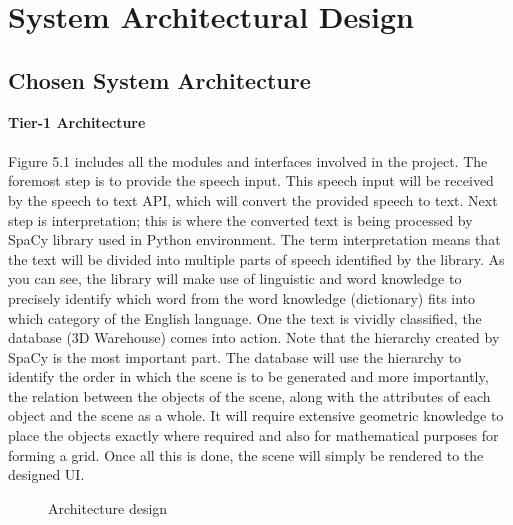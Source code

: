 \section{System Architectural Design}
\subsection{Chosen System Architecture} 
\textbf{Tier-1 Architecture}
\paragraph{}Figure 5.1 includes all the modules and interfaces involved in the project. The foremost step is to provide the speech input. This speech input will be received by the speech to text API, which will convert the provided speech to text.
\linebreak Next step is interpretation; this is where the converted text is being processed by SpaCy library used in Python environment. The term interpretation means that the text will be divided into multiple parts of speech identified by the library. As you can see, the library will make use of linguistic and word knowledge to precisely identify which word from the word knowledge (dictionary) fits into which category of the English language.
\linebreak One the text is vividly classified, the database (3D Warehouse) comes into action. Note that the hierarchy created by SpaCy is the most important part. The database will use the hierarchy to identify the order in which the scene is to be generated and more importantly, the relation between the objects of the scene, along with the attributes of each object and the scene as a whole. It will require extensive geometric knowledge to place the objects exactly where required and also for mathematical purposes for forming a grid. Once all this is done, the scene will simply be rendered to the designed UI.
\newpage
\begin{figure}[htbp]
	\centering
	\caption{Architecture design}
	\label{fig:architecture}
\end{figure}

